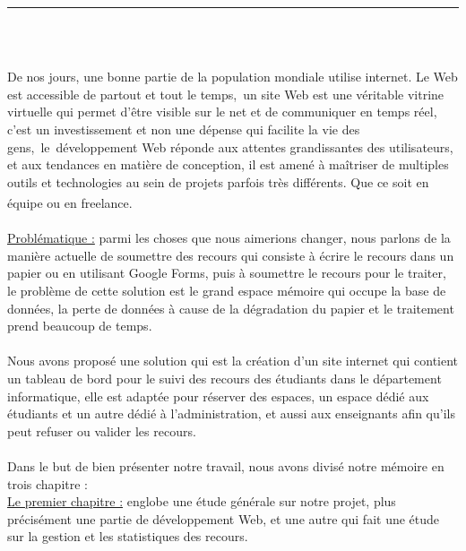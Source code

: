 \documentclass[12pt]{report}
\begin{document}
\begin{center}
    {\color{Blue} \rule{6.2in}{1.4mm} }\\
    \vspace{0.1in}
    \scshape{\fontsize{34}{46}{\bfseries{\color{Blue}{Introduction générale}}}}
    \\
    \vspace{0.5in}
\end{center}
De nos jours, une bonne partie de la population mondiale utilise internet. Le Web est accessible de partout et tout le temps, un site Web est une véritable vitrine virtuelle qui permet d’être visible sur le net et de communiquer en temps réel, c’est un investissement et non une dépense qui facilite la vie des gens, le développement Web réponde aux attentes grandissantes des utilisateurs, et aux tendances en matière de conception, il est amené à maîtriser de multiples outils et technologies au sein de projets parfois très différents. Que ce soit en équipe ou en freelance.\textsuperscript{\cite{berners2001semantic}}
\\\\
\uline{Problématique :} parmi les choses que nous aimerions changer, nous parlons de la manière actuelle de soumettre des recours qui consiste à écrire le recours dans un papier ou en utilisant Google Forms, puis à soumettre le recours pour le traiter, le problème de cette solution est le grand espace mémoire qui occupe la base de données, la perte de données à cause de la dégradation du papier et le traitement prend beaucoup de temps.
\\\\
Nous avons proposé une solution qui est la création d'un site internet qui contient un tableau de bord pour le suivi des recours des étudiants dans le département informatique, elle est adaptée pour réserver des espaces, un espace dédié aux étudiants et un autre dédié à l'administration, et aussi aux enseignants afin qu'ils peut refuser ou valider les recours.
\\\\
Dans le but de bien présenter notre travail, nous avons divisé notre mémoire en trois chapitre :
\\
\uline{Le premier chapitre :} englobe une étude générale sur notre projet, plus précisément une partie de développement Web, et une autre qui fait une étude sur la gestion et les statistiques des recours.
\\
\end{document}
